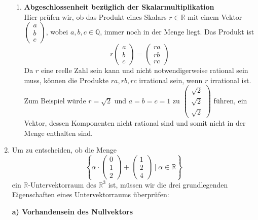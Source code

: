 \documentclass[a4paper]{scrartcl}
\begin{document}
\begin{enumerate}[label=\alph*)]
\begin{enumerate}
      \item \textbf{Abgeschlossenheit bezüglich der Skalarmultiplikation}\\
      Hier prüfen wir, ob das Produkt eines Skalars \(r \in \mathbb{R}\) mit einem Vektor \(\begin{pmatrix} a \\ b \\ c \end{pmatrix}\), wobei \(a, b, c \in \mathbb{Q}\), immer noch in der Menge liegt. Das Produkt ist 
      \[
      r \begin{pmatrix} a \\ b \\ c \end{pmatrix} = \begin{pmatrix} ra \\ rb \\ rc \end{pmatrix}
      \]
      Da \(r\) eine reelle Zahl sein kann und nicht notwendigerweise rational sein muss, können die Produkte \(ra, rb, rc\) irrational sein, wenn \(r\) irrational ist. Zum Beispiel würde \(r = \sqrt{2}\) und \(a = b = c = 1\) zu \(\begin{pmatrix} \sqrt{2} \\ \sqrt{2} \\ \sqrt{2} \end{pmatrix}\) führen, ein Vektor, dessen Komponenten nicht rational sind und somit nicht in der Menge enthalten sind.
  \end{enumerate}
  \item Um zu entscheiden, ob die Menge
  \[
  \left\{ \alpha \cdot \begin{pmatrix} 0 \\ 1 \\ 2 \end{pmatrix} + \begin{pmatrix} 1 \\ 2 \\ 4 \end{pmatrix} \mid \alpha \in \mathbb{R} \right\}
  \]
  ein \(\mathbb{R}\)-Untervektorraum des \(\mathbb{R}^3\) ist, müssen wir die drei grundlegenden Eigenschaften eines Untervektorraums überprüfen:
  
  \textbf{a) Vorhandensein des Nullvektors}
  

\end{enumerate}
\end{document}
